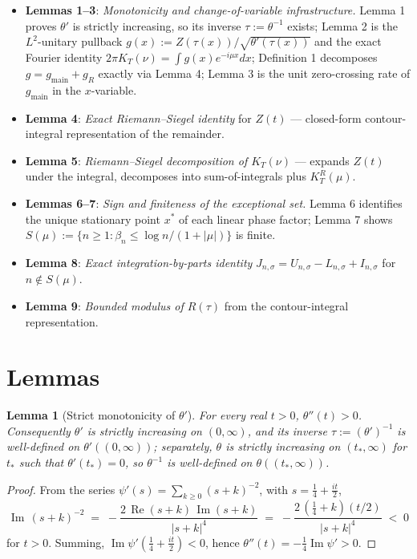 \documentclass[11pt]{article}
\newtheorem{lemma}{Lemma}
\DeclareMathOperator{\ImOp}{Im}
\DeclareMathOperator{\ReOp}{Re}
\let\Im\ImOp
\let\Re\ReOp
\begin{document}
\begin{itemize}
\item \textbf{Lemmas 1--3}: \emph{Monotonicity and change-of-variable infrastructure.} Lemma 1 proves $\theta'$ is strictly increasing, so its inverse $\tau := \theta^{-1}$ exists; Lemma 2 is the $L^{2}$-unitary pullback $g(x) := Z(\tau(x))/\sqrt{\theta'(\tau(x))}$ and the exact Fourier identity $2\pi K_{T}(\nu) = \int g(x)e^{-i\mu x}dx$; Definition 1 decomposes $g = g_{\mathrm{main}} + g_{R}$ exactly via Lemma 4; Lemma 3 is the unit zero-crossing rate of $g_{\mathrm{main}}$ in the $x$-variable.
\item \textbf{Lemma 4}: \emph{Exact Riemann--Siegel identity} for $Z(t)$ --- closed-form contour-integral representation of the remainder.
\item \textbf{Lemma 5}: \emph{Riemann--Siegel decomposition of $K_{T}(\nu)$} --- expands $Z(t)$ under the integral, decomposes into sum-of-integrals plus $K_{T}^{R}(\mu)$.
\item \textbf{Lemmas 6--7}: \emph{Sign and finiteness of the exceptional set.} Lemma 6 identifies the unique stationary point $x^{*}$ of each linear phase factor; Lemma 7 shows $S(\mu) := \{n\ge 1 : \beta_{n}\le\log n/(1+|\mu|)\}$ is finite.
\item \textbf{Lemma 8}: \emph{Exact integration-by-parts identity} $J_{n,\sigma} = U_{n,\sigma} - L_{n,\sigma} + I_{n,\sigma}$ for $n\notin S(\mu)$.
\item \textbf{Lemma 9}: \emph{Bounded modulus of $R(\tau)$} from the contour-integral representation.
\end{itemize}

\section*{Lemmas}

\begin{lemma}[Strict monotonicity of $\theta'$]\label{lem:mono}
For every real $t>0$, $\theta''(t)>0$. Consequently $\theta'$ is strictly increasing on $(0,\infty)$, and its inverse $\tau := (\theta')^{-1}$ is well-defined on $\theta'((0,\infty))$; separately, $\theta$ is strictly increasing on $(t_{*},\infty)$ for $t_{*}$ such that $\theta'(t_{*})=0$, so $\theta^{-1}$ is well-defined on $\theta((t_{*},\infty))$.
\end{lemma}

\begin{proof}
From the series $\psi'(s) = \sum_{k\ge 0}(s+k)^{-2}$, with $s = \tfrac14 + \tfrac{it}{2}$,
\[
\Im\,(s+k)^{-2} \;=\; -\frac{2\,\Re(s+k)\,\Im(s+k)}{|s+k|^{4}} \;=\; -\frac{2\,(\tfrac14+k)(t/2)}{|s+k|^{4}} \;<\;0
\]
for $t>0$. Summing, $\Im\psi'(\tfrac14+\tfrac{it}{2})<0$, hence $\theta''(t) = -\tfrac14\Im\psi' > 0$.
\end{proof}
\end{document}
